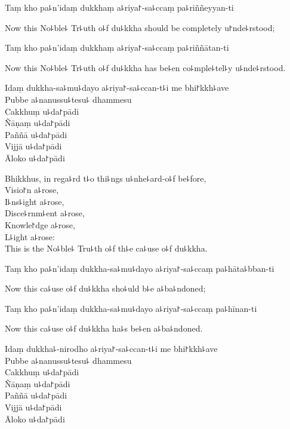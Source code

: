 Taṃ kho pa꜕n'idaṃ dukkhaṃ a꜕riya꜓-sa꜕ccaṃ pa꜕riññeyyan-ti

\begin{english}
  Now this No꜕ble꜕ Tr꜕uth o꜕f du꜕kkha should be completely u꜓nde꜕rstood;
\end{english}

Taṃ kho pa꜕n'idaṃ dukkhaṃ a꜕riya꜓-sa꜕ccaṃ pa꜕riññātan-ti

\begin{english}
  Now this No꜕ble꜕ Tr꜕uth o꜕f du꜕kkha has be꜕en co꜕mple꜕tel꜕y u꜕nde꜕rstood.
\end{english}

Idaṃ dukkha-sa꜕mu꜕dayo a꜕riya꜓-sa꜕ccan-t꜕i me bhi꜓kkh꜕ave\\
Pubbe a꜕nanussu꜕tesu꜕ dhammesu\\
Cakkhuṃ u꜕da꜓pādi\\
Ñāṇaṃ u꜕da꜓pādi\\
Paññā u꜕da꜓pādi\\
Vijjā u꜕da꜓pādi\\
Āloko u꜕da꜓pādi

\clearpage

\begin{english}
  Bhikkhus, in rega꜕rd t꜕o thi꜕ngs u꜕nhe꜕ard-o꜕f be꜕fore,\\
  Visio꜓n a꜕rose,\\
  I꜕ns꜕ight a꜕rose,\\
  Disce꜕rnm꜕ent a꜕rose,\\
  Knowle꜓dge a꜕rose,\\
  L꜕ight a꜕rose:\\
  This is the No꜕ble꜕ Tru꜕th o꜕f th꜕e ca꜕use o꜕f du꜕kkha.
\end{english}

Taṃ kho pa꜕n'idaṃ dukkha-sa꜕mu꜕dayo a꜕riya꜓-sa꜕ccaṃ pa꜕hāta꜕bban-ti

\begin{english}
  Now this ca꜕use o꜕f du꜕kkha sho꜕uld b꜕e a꜕ba꜕ndoned;
\end{english}

Taṃ kho pa꜕n'idaṃ dukkha-sa꜕mu꜕dayo a꜕riya꜓-sa꜕ccaṃ pa꜕hīnan-ti

\begin{english}
  Now this ca꜕use o꜕f du꜕kkha ha꜕s be꜕en a꜕ba꜕ndoned.
\end{english}

Idaṃ dukkha꜕-nirodho a꜕riya꜓-sa꜕ccan-t꜕i me bhi꜓kkh꜕ave\\
Pubbe a꜕nanussu꜕tesu꜕ dhammesu\\
Cakkhuṃ u꜕da꜓pādi\\
Ñāṇaṃ u꜕da꜓pādi\\
Paññā u꜕da꜓pādi\\
Vijjā u꜕da꜓pādi\\
Āloko u꜕da꜓pādi

